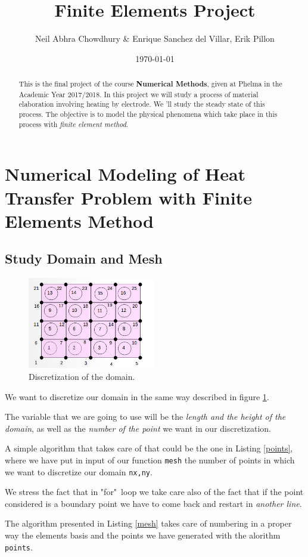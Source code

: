 \documentclass{article}
\date{\today}
\author{Neil Abhra Chowdhury \& Enrique Sanchez del Villar, Erik Pillon}
\title{Finite Elements Project}
\begin{document}
\maketitle
\begin{abstract}
	This is the final project of the course \textbf{Numerical Methods}, given at Phelma in the Academic Year 2017/2018. In this project we will study a process of material elaboration involving heating by electrode. We 'll study the steady state of this process. The objective is to model the physical phenomena which take place in this process with \emph{finite element method}.
\end{abstract}



\section{Numerical Modeling of Heat Transfer Problem with Finite Elements Method}
\subsection{Study Domain and Mesh}
\begin{figure}
	\centering
	\includegraphics[height=4cm]{Images/mesh.png}
	\caption{Discretization of the domain.}
	\label{figure:mesh}
\end{figure}
\begin{mdframed}
	We want to discretize our domain in the same way described in figure \ref{figure:mesh}.
	
	The variable that we are going to use will be the \emph{length and the height of the domain}, as well as the \emph{number of the point} we want in our discretization. 
	
	A simple algorithm that takes care of that could be the one in Listing \ref{points}, where we have put in input of our function \texttt{mesh} the number of points in which we want to discretize our domain \texttt{nx,ny}.   
	
	We stress the fact that in "for"~loop we take care also of the fact that if the point considered is a boundary point we have to come back and restart in \emph{another line}.
	
	The algorithm presented in Listing \ref{mesh} takes care of numbering in a proper way the elements basis and the points we have generated with the alorithm \texttt{points}.
	
\end{mdframed}
\end{document}
